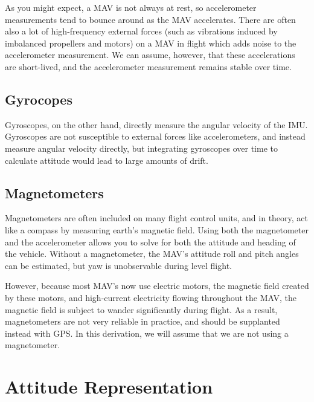 \documentclass[paper=a4, fontsize=11pt]{scrartcl} %
\numberwithin{equation}{section} %
\numberwithin{figure}{section} %
\numberwithin{table}{section} %
\begin{document}
As you might expect, a MAV is not always at rest, so accelerometer measurements tend to bounce around as the MAV accelerates.  There are often also a lot of high-frequency external forces (such as vibrations induced by imbalanced propellers and motors) on a MAV in flight which adds noise to the accelerometer measurement.  We can assume, however, that these accelerations are short-lived, and the accelerometer measurement remains stable over time.

\subsection{Gyrocopes}

Gyroscopes, on the other hand, directly measure the angular velocity of the IMU.  Gyroscopes are not susceptible to external forces like accelerometers, and instead measure angular velocity directly, but integrating gyroscopes over time to calculate attitude would lead to large amounts of drift.

\subsection{Magnetometers}

Magnetometers are often included on many flight control units, and in theory, act like a compass by measuring earth's magnetic field.  Using both the magnetometer and the accelerometer allows you to solve for both the attitude and heading of the vehicle.  Without a magnetometer, the MAV's attitude roll and pitch angles can be estimated, but yaw is unobservable during level flight.

However, because most MAV's now use electric motors, the magnetic field created by these motors, and high-current electricity flowing throughout the MAV, the magnetic field is subject to wander significantly during flight.  As a result, magnetometers are not very reliable in practice, and should be supplanted instead with GPS.  In this derivation, we will assume that we are not using a magnetometer.

\section{Attitude Representation}
\end{document}
